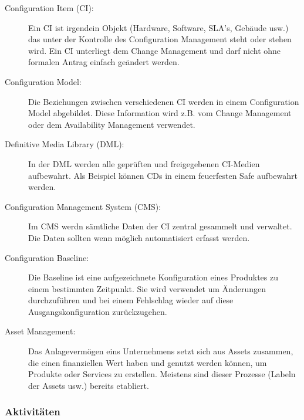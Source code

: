 \begin{description}
	\item[Configuration Item (CI):] Ein CI ist irgendein Objekt (Hardware, Software, SLA's, Gebäude usw.) das unter der Kontrolle des Configuration Management steht oder stehen wird. Ein CI unterliegt dem Change Management und darf nicht ohne formalen Antrag einfach geändert werden.
	\item[Configuration Model:] Die Beziehungen zwischen verschiedenen CI werden in einem Configuration Model abgebildet. Diese Information wird z.B. vom Change Management oder dem Availability Management verwendet.
	\item[Definitive Media Library (DML):] In der DML werden alle geprüften und freigegebenen CI-Medien aufbewahrt. Als Beispiel können CDs in einem feuerfesten Safe aufbewahrt werden.
	\item[Configuration Management System (CMS):] Im CMS werdn sämtliche Daten der CI zentral gesammelt und verwaltet. Die Daten sollten wenn möglich automatisiert erfasst werden.
	\item[Configuration Baseline:] Die Baseline ist eine aufgezeichnete Konfiguration eines Produktes zu einem bestimmten Zeitpunkt. Sie wird verwendet um Änderungen durchzuführen und bei einem Fehlschlag wieder auf diese Ausgangskonfiguration zurückzugehen.
	\item[Asset Management:] Das Anlagevermögen eins Unternehmens setzt sich aus Assets zusammen, die einen finanziellen Wert haben und genutzt werden können, um Produkte oder Services zu erstellen. Meistens sind dieser Prozesse (Labeln der Assets usw.) bereits etabliert.
\end{description}

\subsubsection{Aktivitäten}

